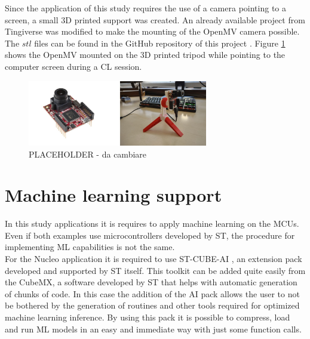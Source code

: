 \documentclass[12pt]{report}
\begin{document}
Since the application of this study requires the use of a camera pointing to a screen, a small 3D printed support was created. An already available project from Tingiverse \autocite{tripod_link} was modified to make the mounting of the OpenMV camera possible. The $stl$ files can be found in the GitHub repository of this project \autocite{github_repo}. Figure \ref{fig:hardware_openmv} shows the OpenMV mounted on the 3D printed tripod while pointing to the computer screen during a CL session.\\

\begin{figure}[h!]
    \centering
    \includegraphics[width=0.7\textwidth]{Figures/Chapter2/hardware_openmv.jpg} 
    \caption{PLACEHOLDER - da cambiare}
    \label{fig:hardware_openmv}    
\end{figure}

\section{Machine learning support}
In this study applications it is requires to apply machine learning on the MCUs. Even if both examples use microcontrollers developed by ST, the procedure for implementing ML capabilities is not the same. \\
For the Nucleo application it is required to use ST-CUBE-AI \autocite{stm_cube_ai}, an extension pack developed and supported by ST itself. This toolkit can be added quite easily from the CubeMX, a software developed by ST that helps with automatic generation of chunks of code. In this case the addition of the AI pack allows the user to not be bothered by the generation of routines and other tools required for optimized machine learning inference. By using this pack it is possible to compress, load and run ML models in an easy and immediate way with just some function calls.
\end{document}

